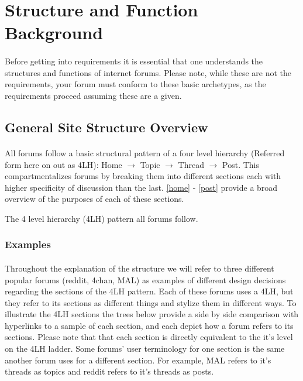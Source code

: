 \documentclass[]{article}
\begin{document}
\section{Structure and Function Background}
\paragraph{}
Before getting into requirements it is essential that one understands the structures and functions of internet forums. Please note, while these are not the requirements, your forum must conform to these basic archetypes, as the requirements proceed assuming these are a given. 

\subsection{General Site Structure Overview}\label{structOver}
\begin{minipage}{0.65\textwidth}
\paragraph{}
All forums follow a basic structural pattern of a four level hierarchy (Referred form here on out as 4LH): Home $\to$ Topic $\to$ Thread $\to$ Post. This compartmentalizes forums by breaking them into different sections each with higher specificity of discussion than the last. \ref{home} - \ref{post} provide a broad overview of the purposes of each of these sections.
\end{minipage}%
\hspace{0.5cm}
\vline
\hspace{0.5cm}
\begin{minipage}{0.35\textwidth}
\vspace{0.5 cm}
The 4 level hierarchy (4LH) pattern all forums follow.  
\end{minipage}%

\newpage

\subsubsection{Examples}\label{StructEx}
\paragraph{}
Throughout the explanation of the structure we will refer to three different popular forums (reddit, 4chan, MAL) as examples of different design decisions regarding the sections of the 4LH pattern. Each of these forums uses a 4LH, but they refer to its sections as different things and stylize them in different ways. To illustrate the 4LH sections the trees below provide a side by side comparison with hyperlinks to a sample of each section, and each depict how a forum refers to its sections. Please note that that each section is directly equivalent to the it's level on the 4LH ladder. Some forums' user terminology for one section is the same another forum uses for a different section. For example, MAL refers to it's threads as topics and reddit refers to it's threads as posts.
\end{document}
